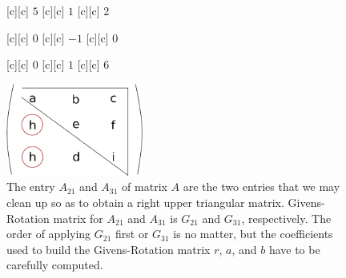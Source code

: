 \begin{figure}[htb!]
	\centering
	\footnotesize

	[c] {$5$}
	[c] {$1$}
	[c] {$2$}

	[c] {$0$}
	[c] {$-1$}
	[c] {$0$}

	[c] {$0$}
	[c] {$1$}
	[c] {$6$}

	\includegraphics[width=0.4\textwidth]{matrixA2131.eps}
	\caption{The entry $A_{21}$ and $A_{31}$ of matrix $A$ are the two entries that we may clean up
		so as to obtain a right upper triangular matrix.
		Givens-Rotation matrix for $A_{21}$ and $A_{31}$ is $G_{21}$ and $G_{31}$, respectively.
		The order of applying $G_{21}$ first or $G_{31}$ is no matter, but
		the coefficients used to build the Givens-Rotation matrix $r$, $a$, and $b$
		have to be carefully computed.}
	\label{\LABEL}
\end{figure}

